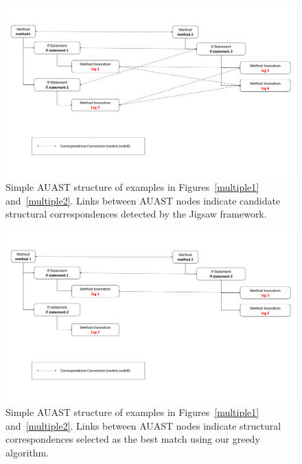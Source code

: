 \begin{figure} [H]
  \centering\includegraphics [width = \textwidth]{Drawing4/multipleLogging.pdf}
  \caption{Simple AUAST structure of examples in Figures~\ref{multiple1} and~\ref{multiple2}. Links between AUAST nodes indicate candidate structural correspondences detected by the Jigsaw framework.}
  \label{mast_1}
\end{figure}


\begin{figure} [H]
  \centering\includegraphics [width = \textwidth]{Drawing4/multipleLogging2.pdf}
  \caption{Simple AUAST structure of examples in Figures~\ref{multiple1} and~\ref{multiple2}. Links between AUAST nodes indicate structural correspondences selected as the best match using our greedy algorithm.}
  \label{m_ast2}
\end{figure}

